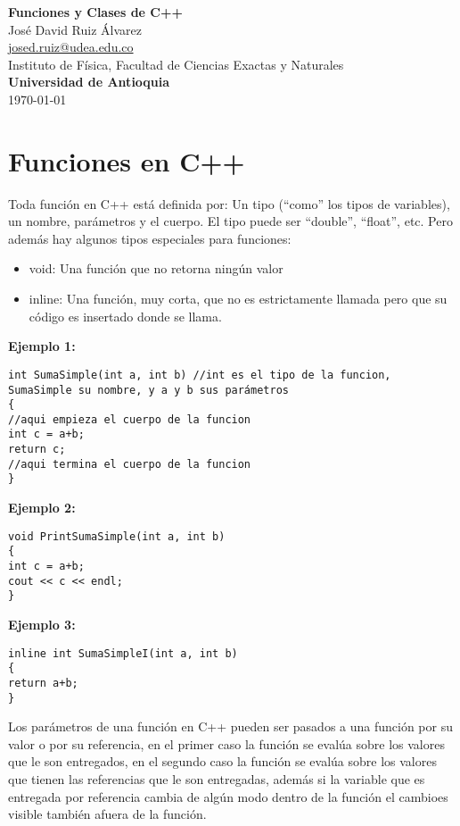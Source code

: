 \documentclass[10.5pt]{article}
\begin{document}
\noindent
\begin{minipage}[b]{0.75\linewidth}
{\LARGE\bf Funciones y Clases de C++}\\ %
\large{Jos\'{e} David Ruiz \'{A}lvarez} \\
\small{\href{mailto:josed.ruiz@udea.edu.co}{josed.ruiz@udea.edu.co}} \\ %
\normalsize{Instituto de Física, Facultad de Ciencias Exactas y Naturales} \\%
\normalsize{\bf Universidad de Antioquia} \\[8mm]
\today %
\end{minipage}%


\section{Funciones en C++}

Toda función en C++ está definida por: Un tipo (``como'' los tipos de variables), un nombre, parámetros y el cuerpo. El tipo puede ser ``double'', ``float'', etc. Pero además hay algunos tipos especiales para funciones:

\begin{itemize}
\item void: Una función que no retorna ningún valor
\item inline: Una función, muy corta, que no es estrictamente llamada pero que su código es insertado donde se llama.
\end{itemize}

{\bf Ejemplo 1:}
\begin{verbatim}
int SumaSimple(int a, int b) //int es el tipo de la funcion, SumaSimple su nombre, y a y b sus parámetros
{
//aqui empieza el cuerpo de la funcion
int c = a+b;
return c;
//aqui termina el cuerpo de la funcion
}
\end{verbatim}

{\bf Ejemplo 2:}
\begin{verbatim}
void PrintSumaSimple(int a, int b) 
{
int c = a+b;
cout << c << endl;
}
\end{verbatim}

{\bf Ejemplo 3:}
\begin{verbatim}
inline int SumaSimpleI(int a, int b) 
{
return a+b;
}
\end{verbatim}

Los parámetros de una función en C++ pueden ser pasados a una función por su valor o por su referencia, en el primer caso la función se evalúa sobre los valores que le son entregados, en el segundo caso la función se evalúa sobre los valores que tienen las referencias que le son entregadas, además si la variable que es entregada por referencia cambia de algún modo dentro de la función el cambioes visible también afuera de la función.
\end{document}

